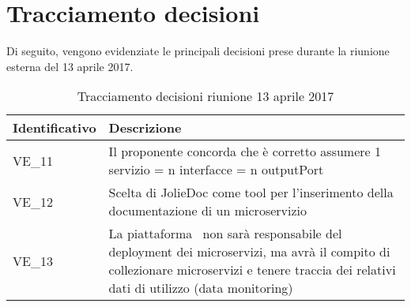 \section{Tracciamento decisioni}
Di seguito, vengono evidenziate le principali decisioni prese durante la riunione esterna del 13 aprile 2017.

\begin{table}[H]
	\begin{center}
		\begin{tabular}{|p{3cm}| p{11cm}|}
			\hline
			\textbf{Identificativo}	& \textbf{Descrizione} \\
			\hline
			VE\_11	&  Il proponente concorda che è corretto assumere 1 servizio = n interfacce = n outputPort \\
			\hline
			VE\_12 &  Scelta di JolieDoc come tool per l'inserimento della documentazione di un microservizio \\
			\hline
			VE\_13 & La piattaforma \progetto\ non sarà responsabile del deployment dei microservizi, ma avrà il compito di collezionare microservizi e tenere traccia dei relativi dati di utilizzo (data monitoring) \\
			\hline
		\end{tabular}
		\caption{Tracciamento decisioni riunione 13 aprile 2017}
	\end{center}
\end{table}
